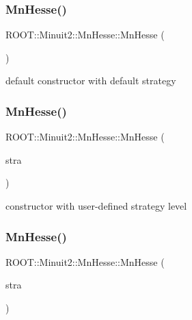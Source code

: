 \subsubsection{\texorpdfstring{MnHesse()}{MnHesse()}\hspace{0.1cm}{\footnotesize\ttfamily [1/9]}}
{\footnotesize\ttfamily R\+O\+O\+T\+::\+Minuit2\+::\+Mn\+Hesse\+::\+Mn\+Hesse (\begin{DoxyParamCaption}{ }\end{DoxyParamCaption})\hspace{0.3cm}{\ttfamily [inline]}}



default constructor with default strategy 

\mbox{\label{classROOT_1_1Minuit2_1_1MnHesse_ad68578086b8b53c029be88acdfe5ec62}} 
\subsubsection{\texorpdfstring{MnHesse()}{MnHesse()}\hspace{0.1cm}{\footnotesize\ttfamily [2/9]}}
{\footnotesize\ttfamily R\+O\+O\+T\+::\+Minuit2\+::\+Mn\+Hesse\+::\+Mn\+Hesse (\begin{DoxyParamCaption}\item[{unsigned int}]{stra }\end{DoxyParamCaption})\hspace{0.3cm}{\ttfamily [inline]}}



constructor with user-\/defined strategy level 

\mbox{\label{classROOT_1_1Minuit2_1_1MnHesse_a06f4f5211bf9c85c8a94fe3be518cdeb}} 
\subsubsection{\texorpdfstring{MnHesse()}{MnHesse()}\hspace{0.1cm}{\footnotesize\ttfamily [3/9]}}
{\footnotesize\ttfamily R\+O\+O\+T\+::\+Minuit2\+::\+Mn\+Hesse\+::\+Mn\+Hesse (\begin{DoxyParamCaption}\item[{const \mbox{\hyperlink{classROOT_1_1Minuit2_1_1MnStrategy}{Mn\+Strategy}} \&}]{stra }\end{DoxyParamCaption})\hspace{0.3cm}{\ttfamily [inline]}}



